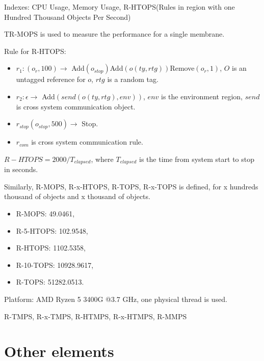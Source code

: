 \documentclass[9pt,a4paper,twoside]{article}
\begin{document}
    Indexes: CPU Usage, Memory Usage, R-HTOPS(Rules in region with one Hundred Thousand Objects Per Second)

    TR-MOPS is used to measure the performance for a single membrane.

    Rule for R-HTOPS: 
    \begin{itemize}
        \item $r_1: (o_r, 100) \rightarrow$ Add$(o_{stop})$Add$(o(ty, rtg))$Remove$(o_r, 1)$, $O$ is an untagged reference for $o$, $rtg$ is a random tag.
        \item $r_2: \epsilon \rightarrow$ Add$(send(o(ty, rtg), env))$, $env$ is the environment region, $send$ is cross system communication object.
        \item $r_{stop} (o_{stop}, 500) \rightarrow$ Stop. 
        \item $r_{com}$ is cross system communication rule.
    \end{itemize}

    $R-HTOPS = 2000 / T_{elapsed}$, where $T_{elapsed}$ is the time from system start to stop in seconds.

    Similarly, R-MOPS, R-x-HTOPS,  R-TOPS, R-x-TOPS is defined, for x hundreds thousand of objects and x thousand of objects.

    \begin{itemize}
        \item R-MOPS: 49.0461,
        \item R-5-HTOPS: 102.9548, 
        \item R-HTOPS: 1102.5358,
        \item R-10-TOPS: 10928.9617,
        \item R-TOPS: 51282.0513.
    \end{itemize}
 
    Platform: AMD Ryzen 5 3400G @3.7 GHz, one physical thread is used.
    
    R-TMPS, R-x-TMPS, R-HTMPS, R-x-HTMPS, R-MMPS
    
    \section{Other elements}

        
\end{document}
